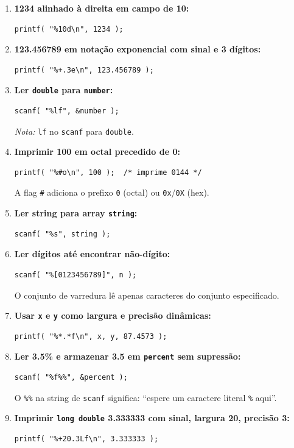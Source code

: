 \documentclass[12pt,a4paper]{article}
\begin{document}
\begin{respostabox}
\begin{enumerate}[label=\textbf{\alph*)}]

\item \textbf{1234 alinhado à direita em campo de 10:}
\begin{lstlisting}
printf( "%10d\n", 1234 );
\end{lstlisting}

\item \textbf{123.456789 em notação exponencial com sinal e 3 dígitos:}
\begin{lstlisting}
printf( "%+.3e\n", 123.456789 );
\end{lstlisting}

\item \textbf{Ler \texttt{double} para \texttt{number}:}
\begin{lstlisting}
scanf( "%lf", &number );
\end{lstlisting}
\textit{Nota:} \texttt{lf} no \texttt{scanf} para \texttt{double}.

\item \textbf{Imprimir 100 em octal precedido de 0:}
\begin{lstlisting}
printf( "%#o\n", 100 );  /* imprime 0144 */
\end{lstlisting}
A flag \texttt{\#} adiciona o prefixo \texttt{0} (octal) ou \texttt{0x}/\texttt{0X} (hex).

\item \textbf{Ler string para array \texttt{string}:}
\begin{lstlisting}
scanf( "%s", string );
\end{lstlisting}

\item \textbf{Ler dígitos até encontrar não-dígito:}
\begin{lstlisting}
scanf( "%[0123456789]", n );
\end{lstlisting}
O conjunto de varredura lê apenas caracteres do conjunto especificado.

\item \textbf{Usar \texttt{x} e \texttt{y} como largura e precisão dinâmicas:}
\begin{lstlisting}
printf( "%*.*f\n", x, y, 87.4573 );
\end{lstlisting}

\item \textbf{Ler 3.5\% e armazenar 3.5 em \texttt{percent} sem supressão:}
\begin{lstlisting}
scanf( "%f%%", &percent );
\end{lstlisting}
O \texttt{\%\%} na string de \texttt{scanf} significa: ``espere um caractere
literal \texttt{\%} aqui''.

\item \textbf{Imprimir \texttt{long double} 3.333333 com sinal, largura 20, precisão 3:}
\begin{lstlisting}
printf( "%+20.3Lf\n", 3.333333 );
\end{lstlisting}

\end{enumerate}
\end{respostabox}
\end{document}
